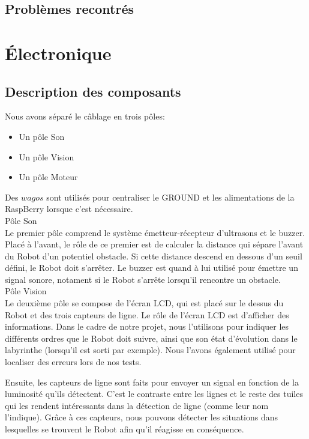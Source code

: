 \documentclass[a4paper,12pt]{article}
\begin{document}
\subsection{Problèmes recontrés}

\newpage
\section{Électronique}
\subsection{Description des composants}

Nous avons séparé le câblage en trois pôles:
\begin{itemize}
    \item Un pôle Son
    \item Un pôle Vision
    \item Un pôle Moteur
\end{itemize}

\noindent Des $wagos$ sont utilisés pour centraliser le GROUND et les alimentations de la RaspBerry lorsque c'est nécessaire.\\

\large Pôle Son \\
Le premier pôle comprend le système émetteur-récepteur d'ultrasons et le buzzer.
Placé à l'avant, le rôle de ce premier est de calculer la distance qui sépare l'avant du Robot d'un potentiel obstacle.
Si cette distance descend en dessous d'un seuil défini, le Robot doit s'arrêter.
Le buzzer est quand à lui utilisé pour émettre un signal sonore, notament si le Robot s'arrête lorsqu'il rencontre un obstacle.\\

\large Pôle Vision \\
Le deuxième pôle se compose de l'écran LCD, qui est placé sur le dessus du Robot et des trois capteurs de ligne.
Le rôle de l'écran LCD est d'afficher des informations.
Dans le cadre de notre projet, nous l'utilisons pour indiquer les différents ordres que le Robot doit suivre, ainsi que son état d'évolution dans le labyrinthe (lorsqu'il est sorti par exemple).
Nous l'avons également utilisé pour localiser des erreurs lors de nos tests.

Ensuite, les capteurs de ligne sont faits pour envoyer un signal en fonction de la luminosité qu'ils détectent.
C'est le contraste entre les lignes et le reste des tuiles qui les rendent intéressants dans la détection de ligne (comme leur nom l'indique).
Grâce à ces capteurs, nous pouvons détecter les situations dans lesquelles se trouvent le Robot afin qu'il réagisse en conséquence.\\
\end{document}
